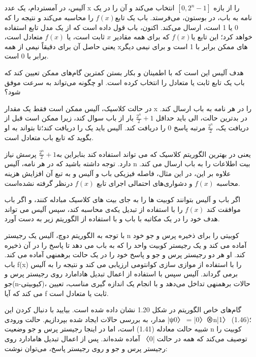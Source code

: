\documentclass{book}
\begin{document}
آلیس، در آمستردام، یک عدد x را از بازه‌ $[0, 2^n-1]$ انتخاب می‌کند و آن را در یک نامه به باب، در بوستون، می‌فرستد. باب یک تابع$ f(x)$ را محاسبه می‌کند و نتیجه را که 0 یا 1 است، ارسال می‌کند. اکنون، باب قول داده است که از یک مدل تابع استفاده خواهد کرد؛ این تابع یا$ f(x)$ که برای همه مقادیر $x$ ثابت است، یا $f(x)$ متعادل است، یعنی‌ حاصل آن برای دقیقاً نیمی از همه xهای ممکن برابر با 1 است و برای نیمی دیگر برابر با 0 است.

هدف آلیس این است که با اطمینان و بکار بستن کمترین گام‌های ممکن تعیین کند که باب یک تابع ثابت یا متعادل را انتخاب کرده است. او چگونه می‌تواند به سرعت موفق شود؟

در حالت کلاسیک، آلیس ممکن است فقط یک مقدار x را در هر نامه به باب ارسال کند. در بدترین حالت، الی باید حداقل $\frac{2^n}{2} + 1$ بار از باب سوال کند، زیرا ممکن است قبل از دریافت یک، $\frac{2^n}{2}$ مرتبه پاسخ $0$ را دریافت کند. آلیس باید یک را دریافت کند؛‌تا بتواند به او بگوید که تابع باب متعادل است. 

یعنی در بهترین الگوریتم کلاسیک که می تواند استفاده کند بنابراین به$\frac{2^n}{2} + 1$ پرسش نیاز دارد. توجه داشته باشید که در هر نامه، آلیس n بیت اطلاعات را به باب ارسال می کند. علاوه بر این، در این مثال، فاصله فیزیکی باب و آلیس و به تبع آن افزایش هزینه محاسبه $f(x)$ و دشواری‌های احتمالی اجرای تابع $f(x)$ درنظر گرفته نشده‌است.

	اگر باب و آلیس بتوانند کوبیت ها را به جای بیت های کلاسیک مبادله کنند، و اگر باب موافقت کند $f (x)$ را با استفاده از تبدیل یکه‌ی  محاسبه کند، سپس آلیس می تواند هدف خود را در یک مکاتبه با باب و با استفاده از الگوریتم زیر به دست آورد.
	
	با توجه به الگوریتم دوچ، آلیس یک رجیستر n کوبیتی را برای ذخیره پرس و جو خود آماده می کند و یک رجیستر کوبیت واحد را که به باب می دهد تا پاسخ را در آن ذخیره کند. او هر دو رجیستر پرس و جو و پاسخ خود را در یک حالت برهمنهی آماده می کند. باب f(x) را با استفاده از موازی سازی کوانتومی ارزیابی می کند و نتیجه را به آلیس برمی گرداند. آلیس سپس با استفاده از اعمال تبدیل هادامارد روی رجیستر پرس و جو(n-کیوبیتی)، حالات برهمنهی تداخل می‌دهد و با انجام یک اندازه گیری مناسب، تعیین می کند که آیا f ثابت یا متعادل است.
		
	گام‌های خاص الگوریتم در شکل 1.20 نشان داده شده است. بیایید با دنبال کردن این مدار، به بررسی حالات ایجاد شده بپردازیم.
	حالت ورودی |ψ0〉 = |0〉⊗n|1〉 (1.46)؛‌ شبیه حالت معادله (1.41) است، اما در اینجا رجیستر پرس و جو وضعیت n کوبیت را توصیف می‌کند که همه در حالت |0〉 آماده شده‌اند. پس از اعمال تبدیل هامادارد روی رجیستر پرس و جو  و روی رجیستر پاسخ، می‌توان نوشت:
	
\end{document}
